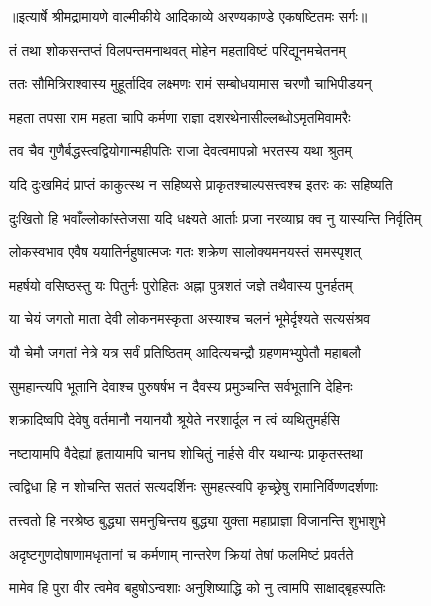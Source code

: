 {॥इत्यार्षे श्रीमद्रामायणे वाल्मीकीये आदिकाव्ये अरण्यकाण्डे एकषष्टितमः सर्गः॥}


\twolineshloka
{तं तथा शोकसन्तप्तं विलपन्तमनाथवत्}
{मोहेन महताविष्टं परिद्यूनमचेतनम्} %

\twolineshloka
{ततः सौमित्रिराश्वास्य मुहूर्तादिव लक्ष्मणः}
{रामं सम्बोधयामास चरणौ चाभिपीडयन्} %

\twolineshloka
{महता तपसा राम महता चापि कर्मणा}
{राज्ञा दशरथेनासील्लब्धोऽमृतमिवामरैः} %

\twolineshloka
{तव चैव गुणैर्बद्धस्त्वद्वियोगान्महीपतिः}
{राजा देवत्वमापन्नो भरतस्य यथा श्रुतम्} %

\twolineshloka
{यदि दुःखमिदं प्राप्तं काकुत्स्थ न सहिष्यसे}
{प्राकृतश्चाल्पसत्त्वश्च इतरः कः सहिष्यति} %

\twolineshloka
{दुःखितो हि भवाँल्लोकांस्तेजसा यदि धक्ष्यते}
{आर्ताः प्रजा नरव्याघ्र क्व नु यास्यन्ति निर्वृतिम्} %

\twolineshloka
{लोकस्वभाव एवैष ययातिर्नहुषात्मजः}
{गतः शक्रेण सालोक्यमनयस्तं समस्पृशत्} %

\twolineshloka
{महर्षयो वसिष्ठस्तु यः पितुर्नः पुरोहितः}
{अह्ना पुत्रशतं जज्ञे तथैवास्य पुनर्हतम्} %

\twolineshloka
{या चेयं जगतो माता देवी लोकनमस्कृता}
{अस्याश्च चलनं भूमेर्दृश्यते सत्यसंश्रव} %

\twolineshloka
{यौ चेमौ जगतां नेत्रे यत्र सर्वं प्रतिष्ठितम्}
{आदित्यचन्द्रौ ग्रहणमभ्युपेतौ महाबलौ} %

\twolineshloka
{सुमहान्त्यपि भूतानि देवाश्च पुरुषर्षभ}
{न दैवस्य प्रमुञ्चन्ति सर्वभूतानि देहिनः} %

\twolineshloka
{शक्रादिष्वपि देवेषु वर्तमानौ नयानयौ}
{श्रूयेते नरशार्दूल न त्वं व्यथितुमर्हसि} %

\twolineshloka
{नष्टायामपि वैदेह्यां हृतायामपि चानघ}
{शोचितुं नार्हसे वीर यथान्यः प्राकृतस्तथा} %

\twolineshloka
{त्वद्विधा हि न शोचन्ति सततं सत्यदर्शिनः}
{सुमहत्स्वपि कृच्छ्रेषु रामानिर्विण्णदर्शणाः} %

\twolineshloka
{तत्त्वतो हि नरश्रेष्ठ बुद्ध्या समनुचिन्तय}
{बुद्ध्या युक्ता महाप्राज्ञा विजानन्ति शुभाशुभे} %

\twolineshloka
{अदृष्टगुणदोषाणामधृतानां च कर्मणाम्}
{नान्तरेण क्रियां तेषां फलमिष्टं प्रवर्तते} %

\twolineshloka
{मामेव हि पुरा वीर त्वमेव बहुषोऽन्वशाः}
{अनुशिष्याद्धि को नु त्वामपि साक्षाद्बृहस्पतिः} %

